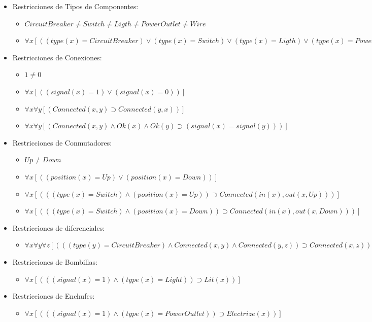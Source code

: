 \documentclass[10pt, a4paper,spanish]{article}
\begin{document}
			\begin{itemize}

				\item Restricciones de Tipos de Componentes:
				\begin{itemize}
					\item $ CircuitBreaker \neq Switch\neq Ligth \neq PowerOutlet \neq Wire   $
					\item $ \forall x [((type(x) = CircuitBreaker) \lor (type(x) = Switch) \lor (type(x) = Ligth) \lor (type(x) = PowerOutlet) \lor (type(x) = Wire))] $
				\end{itemize}
				\item Restricciones de Conexiones:
				\begin{itemize}
					\item $ 1 \neq 0 $
					\item $ \forall x [((signal(x) = 1) \lor (signal(x) = 0))] $
					\item $ \forall x \forall y [(Connected(x, y) \supset Connected(y, x))] $
					\item $ \forall x \forall y [(Connected(x, y) \land Ok(x) \land Ok(y) \supset (signal(x) = signal(y)))] $
				\end{itemize}

				\item Restricciones de Conmutadores:
				\begin{itemize}
					\item $ Up \neq Down $
					\item $ \forall x [( (position(x) = Up) \lor (position(x) = Down))] $
					\item $ \forall x [( ( (type(x) = Switch) \land (position(x) = Up) ) \supset Connected(in(x), out(x, Up)))] $
					\item $ \forall x [( ( (type(x) = Switch) \land (position(x) = Down) ) \supset Connected(in(x), out(x, Down)))] $
				\end{itemize}

				\item Restricciones de diferenciales:
				\begin{itemize}
					\item $ \forall x \forall y \forall z [( ((type(y) = CircuitBreaker) \land Connected(x, y) \land Connected(y, z) ) \supset Connected(x, z))] $
				\end{itemize}

				\item Restricciones de Bombillas:
				\begin{itemize}
					\item$ \forall x [(((signal(x) = 1) \land (type(x) = Light) )  \supset Lit(x))] $
				\end{itemize}

				\item Restricciones de Enchufes:
				\begin{itemize}
					\item$ \forall x [(((signal(x) = 1) \land (type(x) = PowerOutlet) )  \supset Electrize(x))] $
				\end{itemize}
			\end{itemize}
\end{document}
